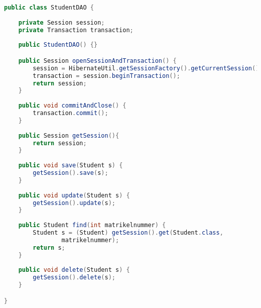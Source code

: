 \hspace{0pt}
\begin{lstlisting}[language=Java]
public class StudentDAO {
	
	private Session session;
	private Transaction transaction;
	
	public StudentDAO() {} 

	public Session openSessionAndTransaction() {
		session = HibernateUtil.getSessionFactory().getCurrentSession();
		transaction = session.beginTransaction();
		return session;
	}
	
	public void commitAndClose() {
		transaction.commit();
	}
	
	public Session getSession(){
		return session;
	}
	
	public void save(Student s) {
		getSession().save(s);
	}
	
	public void update(Student s) {
		getSession().update(s);
	}
	
	public Student find(int matrikelnummer) {
		Student s = (Student) getSession().get(Student.class, 
				matrikelnummer);
		return s;
	}
	
	public void delete(Student s) {
		getSession().delete(s);
	}

}

\end{lstlisting}
